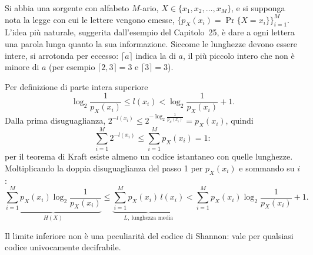 Si abbia una sorgente con alfabeto $M$-ario, $X \in \{x_1, x_2, \ldots, x_M\}$, e si supponga nota la legge con cui le
lettere vengono emesse, $\{p_X(x_i) = \Pr\{X = x_i\}\}_{i=1}^{M}$. L'idea più naturale, suggerita dall'esempio del
Capitolo~25, è dare a ogni lettera una parola lunga quanto la sua informazione. Siccome le lunghezze devono essere
intere, si arrotonda per eccesso: $\lceil a \rceil$ indica la  di $a$, il più piccolo intero
che non è minore di $a$ (per esempio $\lceil 2{,}3 \rceil = 3$ e $\lceil 3 \rceil = 3$).



\begin{dimostrazione}
 Per definizione di parte intera superiore
\[ \log_2 \frac{1}{p_X(x_i)} \leq l(x_i) < \log_2 \frac{1}{p_X(x_i)} + 1 . \]
 Dalla prima disuguaglianza, $2^{-l(x_i)} \leq 2^{-\log_2 \frac{1}{p_X(x_i)}} = p_X(x_i)$, quindi
\[ \sum_{i=1}^{M} 2^{-l(x_i)} \leq \sum_{i=1}^{M} p_X(x_i) = 1 : \]
per il teorema di Kraft esiste almeno un codice istantaneo con quelle lunghezze.
 Moltiplicando la doppia disuguaglianza del passo 1 per $p_X(x_i)$ e sommando su $i$:
\[ \underbrace{\sum_{i=1}^{M} p_X(x_i) \log_2 \frac{1}{p_X(x_i)}}_{H(X)} \leq \underbrace{\sum_{i=1}^{M} p_X(x_i)\,
   l(x_i)}_{L,\ \text{lunghezza media}} < \sum_{i=1}^{M} p_X(x_i) \log_2 \frac{1}{p_X(x_i)} + 1 . \]
\end{dimostrazione}

Il limite inferiore non è una peculiarità del codice di Shannon: vale per qualsiasi codice univocamente decifrabile.


